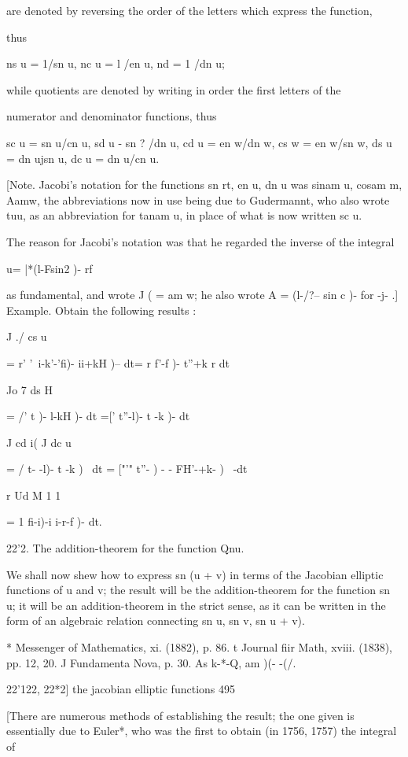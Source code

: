 are denoted by reversing the order of the letters which express the
function,

thus

ns u = 1/sn u, nc u = l /en u, nd = 1 /dn u;

while quotients are denoted by writing in order the first letters of
the

numerator and denominator functions, thus

sc u = sn u/cn u, sd u - sn ? /dn u, cd u = en w/dn w, cs w = en w/sn
w, ds u = dn ujsn u, dc u = dn u/cn u.

[Note. Jacobi's notation for the functions sn rt, en u, dn u was sinam
u, cosam m, Aamw, the abbreviations now in use being due to
Gudermannt, who also wrote tuu, as an abbreviation for tanam u, in
place of what is now written sc u.

The reason for Jacobi's notation was that he regarded the inverse of
the integral

u= |*(l-Fsin2 )- rf

as fundamental, and wrote J ( = am w; he also wrote A = (l-/?-- sin c
)- for -j- .] Example. Obtain the following results :

J ./ cs u

= r' '\ i-k'-'fi)- ii+kH )-- dt= r f'-f )- t''+k r dt

Jo 7 ds H

= /' t )- l-kH )- dt =[' t''-l)- t -k )- dt

J cd i( J dc u

= / t- -l)- t -k )~ dt = ["'" t''- ) - - FH'-+k- )~ -dt

r Ud M 1 1

= 1 fi-i)-i i-r-f )- dt.

22'2. The addition-theorem for the function Qnu.

We shall now shew how to express sn (u + v) in terms of the Jacobian
elliptic functions of u and v; the result will be the
addition-theorem for the function sn u; it will be an
addition-theorem in the strict sense, as it can be written in the form
of an algebraic relation connecting sn u, sn v, sn u + v).

* Messenger of Mathematics, xi. (1882), p. 86. t Journal fiir Math,
xviii. (1838), pp. 12, 20. J Fundamenta Nova, p. 30. As k-*-Q, am )(-
-(/.

22'122, 22*2] the jacobian elliptic functions 495

[There are numerous methods of establishing the result; the one given
is essentially due to Euler*, who was the first to obtain (in 1756,
1757) the integral of

